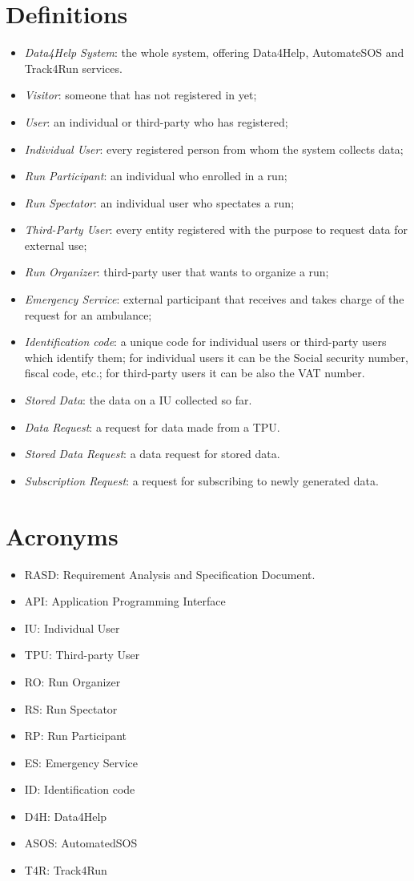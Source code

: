 \section{Definitions}
\begin{itemize}
\item \textit{Data4Help System}: the whole system, offering Data4Help, AutomateSOS and Track4Run services.
\item \textit{Visitor}: someone that has not registered in yet;
\item \textit{User}: an individual or third-party who has registered;
\item \textit{Individual User}: every registered person from whom the system collects data; 
\item \textit{Run Participant}: an individual who enrolled in a run;
\item \textit{Run Spectator}: an individual user who spectates a run;
\item \textit{Third-Party User}: every entity registered with the purpose to request data for external use;
\item \textit{Run Organizer}: third-party user that wants to organize a run;
\item \textit{Emergency Service}: external participant that receives and takes charge of the request for an ambulance;
\item \textit{Identification code}: a unique code for individual users or third-party users which identify them; for individual users it can be the Social security number, fiscal code, etc.; for third-party users it can be also the VAT number.
\item \textit{Stored Data}: the data on a IU collected so far.
\item \textit{Data Request}: a request for data made from a TPU.
\item \textit{Stored Data Request}: a data request for stored data.
\item \textit{Subscription Request}: a request for subscribing to newly generated data.
\end{itemize}
\section{Acronyms}
\begin{itemize}
\item RASD: Requirement Analysis and Specification Document. 
\item API: Application Programming Interface
\item IU: Individual User
\item TPU: Third-party User
\item RO: Run Organizer 
\item	RS: Run Spectator 
\item	RP: Run Participant 
\item	ES: Emergency Service 
\item	ID: Identification code
\item	D4H: Data4Help
\item	ASOS: AutomatedSOS
\item	T4R: Track4Run
\end{itemize}

